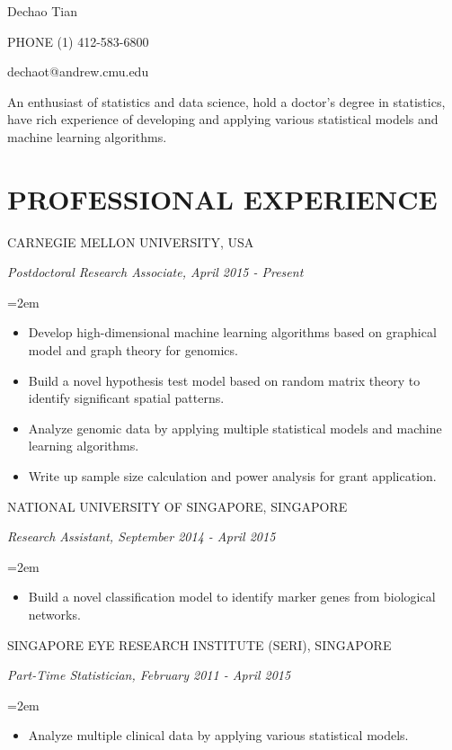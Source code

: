 \documentclass[paper=letter,fontsize=11pt]{scrartcl} %
\newcommand{\MyName}[3]{ %
    \Huge \usefont{OT1}{phv}{b}{n} \begin{center} #1 \end{center}  
         \normalsize \normalfont 
         \vspace{-10pt}
        \begin{minipage}[t]{0.47\textwidth} \begin{flushright} #2 \end{flushright} \end{minipage}
            \hfill
        \begin{minipage}[t]{0.47\textwidth} #3 \end{minipage} }
\newcommand{\MySlogan}[1]{ %
    \noindent \begin{center} #1 \end{center}
		\par \normalsize \normalfont}
\newcommand{\NewPart}[2]{\section*{\uppercase{#1} #2}}
\newcommand{\EducationEntry}[4]{
		\noindent \uppercase{#3}  \par  %
		\noindent \textit{#1, #2}         %
        \par }
\newcommand{\WorkEntry}[4]{				  %
		\noindent \uppercase{#1}  \par %
		\noindent \textit{#2, #3} \par %
        \noindent\hangindent=2em\hangafter=0 \small #4 %
		\normalsize \par}
\begin{document}
\thispagestyle{empty}



\MyName{Dechao Tian}{PHONE (1) 412-583-6800}{dechaot@andrew.cmu.edu}

\vspace{8pt}
\MySlogan{An enthusiast of statistics and data science, hold a doctor's degree in statistics, have rich experience of developing and applying various statistical models and machine learning algorithms. }
\vspace{8pt}


\NewPart{Professional experience}{}
\WorkEntry{Carnegie Mellon University, USA}{Postdoctoral Research Associate}{April 2015 - Present} 
{\begin{itemize}
\item Develop high-dimensional machine learning algorithms based on graphical model and graph theory for genomics.
\item Build a novel hypothesis test model based on random matrix theory to identify significant spatial patterns.
\item Analyze genomic data by applying multiple statistical models and machine learning algorithms.
\item Write up sample size calculation and power analysis for grant application. 
\end{itemize}}
\WorkEntry{National University of Singapore, Singapore}{Research Assistant}{September 2014 - April 2015}{\begin{itemize} \item Build a novel classification model to identify marker genes from biological networks. \end{itemize}}
\WorkEntry{Singapore Eye Research Institute (SERI), Singapore}{Part-Time Statistician}{February 2011 - April 2015}{\begin{itemize} 
    \item Analyze multiple clinical data by applying various statistical models.  
\end{itemize}}
\end{document}
